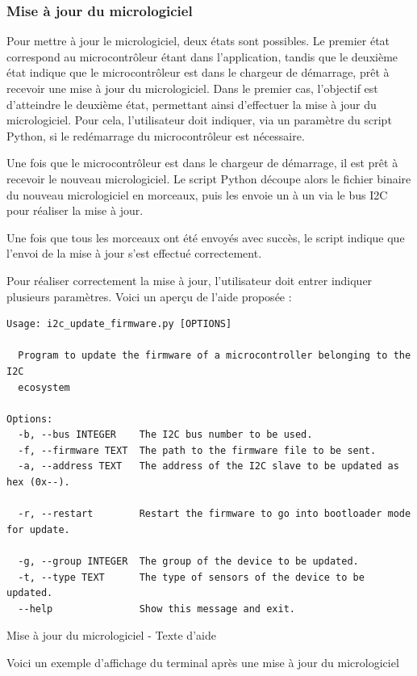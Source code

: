 \subsubsection{Mise à jour du micrologiciel}

Pour mettre à jour le micrologiciel, deux états sont possibles.
Le premier état correspond au microcontrôleur étant dans l'application, tandis que le deuxième état indique que le microcontrôleur est dans le chargeur de démarrage, prêt à recevoir une mise à jour du micrologiciel.
Dans le premier cas, l'objectif est d'atteindre le deuxième état, permettant ainsi d'effectuer la mise à jour du micrologiciel.
Pour cela, l'utilisateur doit indiquer, via un paramètre du script Python, si le redémarrage du microcontrôleur est nécessaire.

Une fois que le microcontrôleur est dans le chargeur de démarrage, il est prêt à recevoir le nouveau micrologiciel.
Le script Python découpe alors le fichier binaire du nouveau micrologiciel en morceaux, puis les envoie un à un via le bus I2C pour réaliser la mise à jour.

Une fois que tous les morceaux ont été envoyés avec succès, le script indique que l'envoi de la mise à jour s'est effectué correctement.

Pour réaliser correctement la mise à jour, l'utilisateur doit entrer indiquer plusieurs paramètres. Voici un aperçu de l'aide proposée :

\begin{listing}[!h]
    \begin{lstlisting}
Usage: i2c_update_firmware.py [OPTIONS]

  Program to update the firmware of a microcontroller belonging to the I2C
  ecosystem

Options:
  -b, --bus INTEGER    The I2C bus number to be used.
  -f, --firmware TEXT  The path to the firmware file to be sent.
  -a, --address TEXT   The address of the I2C slave to be updated as hex (0x--).

  -r, --restart        Restart the firmware to go into bootloader mode for update.

  -g, --group INTEGER  The group of the device to be updated.
  -t, --type TEXT      The type of sensors of the device to be updated.
  --help               Show this message and exit.
    \end{lstlisting}
    \caption{Mise à jour du micrologiciel - Texte d'aide}
\end{listing}

Voici un exemple d'affichage du terminal après une mise à jour du micrologiciel

